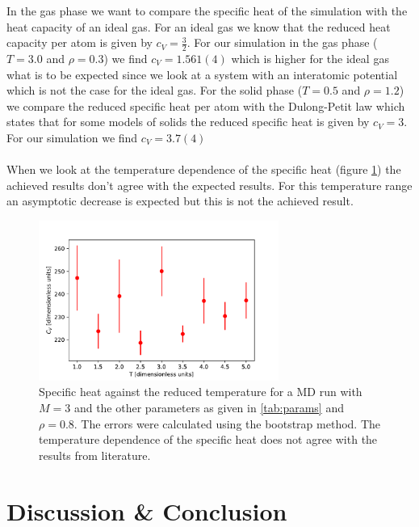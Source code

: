 \documentclass[10 pt, a4paper]{article}
\begin{document}
In the gas phase we want to compare the specific heat of the simulation with the heat capacity of an ideal gas. For an ideal gas we know that the reduced heat capacity per atom is given by $c_V = \frac{3}{2}$. For our simulation in the gas phase ($T = 3.0$ and $\rho = 0.3$) we find $c_V = 1.561(4)$ which is higher for the ideal gas what is to be expected since we look at a system with an interatomic potential which is not the case for the ideal gas. For the solid phase ($T = 0.5$ and $\rho = 1.2$) we compare the reduced specific heat per atom with the Dulong-Petit law which states that for some models of solids the reduced specific heat is given by $c_V = 3$. For our simulation we find $c_V = 3.7(4)$
\\
\\
When we look at the temperature dependence of the specific heat (figure \ref{fig:specific}) the achieved results don't agree with the expected results. For this temperature range an asymptotic decrease is expected \cite{obser} but this is not the achieved result.


\begin{figure}[H]
\centering
\includegraphics[width=0.7\textwidth]{specific_heat}
\caption{Specific heat against the reduced temperature for a MD run with $M = 3$ and the other parameters as given in \ref{tab:params} and $\rho = 0.8$. The errors were calculated using the bootstrap method. The temperature dependence of the specific heat does not agree with the results from literature\cite{obser}.}
\label{fig:specific}
\end{figure}

\section{Discussion \& Conclusion}
\end{document}
